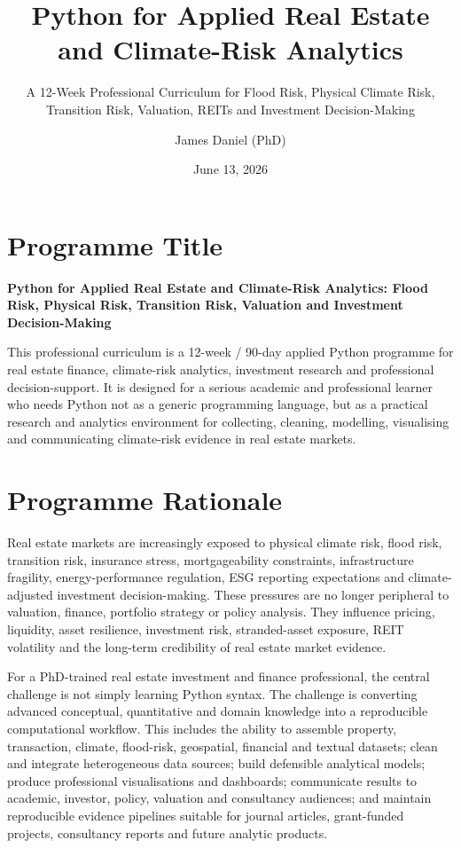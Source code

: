 \documentclass[
  a4paper,
]{article}
\title{Python for Applied Real Estate and Climate-Risk Analytics}
\subtitle{A 12-Week Professional Curriculum for Flood Risk, Physical
Climate Risk, Transition Risk, Valuation, REITs and Investment
Decision-Making}
\author{James Daniel (PhD)}
\date{June 13, 2026}
\renewcommand*\contentsname{Table of contents}
\newcommand\contentsname{Table of contents}
\begin{document}
\maketitle

\renewcommand*\contentsname{Table of contents}
{
\setcounter{tocdepth}{2}
\tableofcontents
}

\section{Programme Title}\label{programme-title}

\textbf{Python for Applied Real Estate and Climate-Risk Analytics: Flood
Risk, Physical Risk, Transition Risk, Valuation and Investment
Decision-Making}

This professional curriculum is a 12-week / 90-day applied Python
programme for real estate finance, climate-risk analytics, investment
research and professional decision-support. It is designed for a serious
academic and professional learner who needs Python not as a generic
programming language, but as a practical research and analytics
environment for collecting, cleaning, modelling, visualising and
communicating climate-risk evidence in real estate markets.

\section{Programme Rationale}\label{programme-rationale}

Real estate markets are increasingly exposed to physical climate risk,
flood risk, transition risk, insurance stress, mortgageability
constraints, infrastructure fragility, energy-performance regulation,
ESG reporting expectations and climate-adjusted investment
decision-making. These pressures are no longer peripheral to valuation,
finance, portfolio strategy or policy analysis. They influence pricing,
liquidity, asset resilience, investment risk, stranded-asset exposure,
REIT volatility and the long-term credibility of real estate market
evidence.

For a PhD-trained real estate investment and finance professional, the
central challenge is not simply learning Python syntax. The challenge is
converting advanced conceptual, quantitative and domain knowledge into a
reproducible computational workflow. This includes the ability to
assemble property, transaction, climate, flood-risk, geospatial,
financial and textual datasets; clean and integrate heterogeneous data
sources; build defensible analytical models; produce professional
visualisations and dashboards; communicate results to academic,
investor, policy, valuation and consultancy audiences; and maintain
reproducible evidence pipelines suitable for journal articles,
grant-funded projects, consultancy reports and future analytic products.
\end{document}
